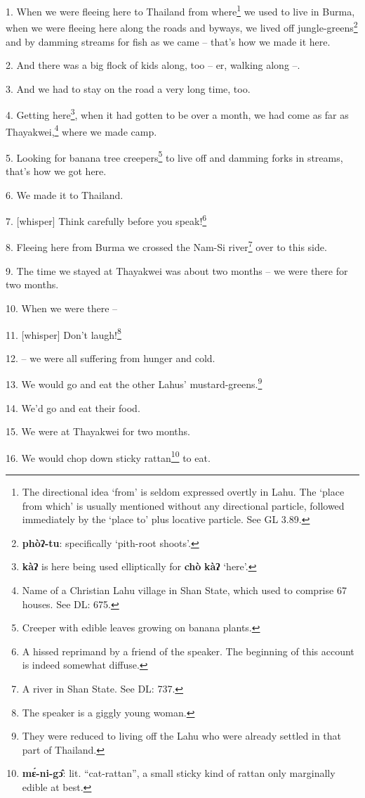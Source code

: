 \setcounter{footnote}{0}

1. When we were fleeing here to Thailand from where\footnote{The directional idea `from' is seldom expressed overtly in Lahu. The `place from which' is usually mentioned without any directional particle, followed immediately by the `place to' plus locative particle. See GL 3.89.} we used to live in Burma,
when we were fleeing here along the roads and byways, we lived off jungle-greens\footnote{\textbf{phòʔ-tu}: specifically `pith-root shoots'.}
and by damming streams for fish as we came -- that's how we made it here.

2. And there was a big flock of kids along, too -- er, walking along --.

3. And we had to stay on the road a very long time, too.

4. Getting here\footnote{\textbf{kàʔ} is here being used elliptically for \textbf{chò} \textbf{kàʔ} `here'.}, when it had gotten to be over a month, we had come as far as
Thayakwei,\footnote{Name of a Christian Lahu village in Shan State, which used to comprise 67 houses. See DL: 675.} where we made camp.

5. Looking for banana tree creepers\footnote{Creeper with edible leaves growing on banana plants.} to live off and damming forks in streams,
that's how we got here.

6. We made it to Thailand.

7. [whisper] Think carefully before you speak!\footnote{A hissed reprimand by a friend of the speaker. The beginning of this account is indeed somewhat diffuse.}

8. Fleeing here from Burma we crossed the Nam-Si river\footnote{A river in Shan State. See DL: 737.} over to this side.

9. The time we stayed at Thayakwei was about two months -- we were there for two
months.

10. When we were there --

11. [whisper] Don't laugh!\footnote{The speaker is a giggly young woman.}

12. -- we were all suffering from hunger and cold.

13. We would go and eat the other Lahus' mustard-greens.\footnote{They were reduced to living off the Lahu who were already settled in that part of Thailand.}

14. We'd go and eat their food.

15. We were at Thayakwei for two months.

16. We would chop down sticky rattan\footnote{\textbf{mɛ́-ni-gɔ̂}: lit. ``cat-rattan'', a small sticky kind of rattan only marginally edible at best.} to eat.

